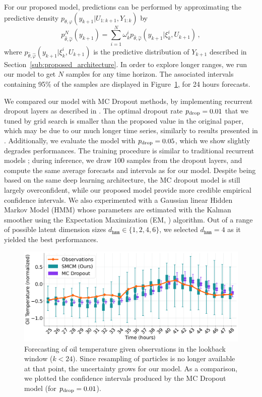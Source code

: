 \documentclass[conference]{IEEEtran}
\begin{document}
For our proposed model, predictions can be performed by approximating the predictive density $p_{\theta,\varphi}(y_{k+1}|U_{1:k+1},Y_{1:k})$ by
$$
	p^N_{\widehat\theta,\widehat\varphi}(y_{k+1})= \sum_{i=1}^{N}\omega_k^i p_{\widehat\theta,\widehat\varphi}(y_{k+1}|\xi_k^i,U_{k+1})\,,
$$
where $ p_{\widehat\theta,\widehat\varphi}(y_{k+1}|\xi_k^i,U_{k+1})$ is the predictive distribution of $Y_{k+1}$ described in Section~\ref{sub:proposed_architecture}.
In order to explore longer ranges, we run our model to get $N$ samples for any time horizon.
The associated intervals containing 95\% of the samples are displayed in Figure~\ref{fig:filter_k+24}, for 24 hours forecasts.

We compared our model with MC Dropout methods, by implementing recurrent dropout layers as described in \cite{Gal2016NIPS}.
The optimal dropout rate $p_\textnormal{drop}=0.01$ that we tuned by grid search is smaller than the proposed value in the original paper, which may be due to our much longer time series, similarly to results presented in \cite{Zhu2017DeepAC}.
Additionally, we evaluate the model with $p_\textnormal{drop}=0.05$, which we show slightly degrades performances.
The training procedure is similar to traditional recurrent models ; during inference, we draw $100$ samples from the dropout layers, and compute the same average forecasts and  intervals as for our model.
Despite being based on the same deep learning architecture, the MC dropout model is still largely overconfident, while our proposed model provide more credible empirical confidence intervals.
We also experimented with a Gaussian linear Hidden Markov Model (HMM) whose parameters are estimated with the Kalman smoother using the Expectation Maximization (EM, \cite{Dempster77EM}) algorithm.
Out of a range of possible latent dimension sizes $d_{\texttt{hmm}} \in \{1, 2, 4, 6\}$, we selected $d_{\texttt{hmm}}=4$ as it yielded the best performances.

\begin{figure}[htpb]
	\centering
	\includegraphics[width=0.8\linewidth]{filter_kp24_ett.png}
	\caption{Forecasting of oil temperature given observations in the lookback window ($k<24$).
		Since resampling of particles is no longer available at that point, the uncertainty grows for our model.
		As a comparison, we plotted the confidence intervals produced by the MC Dropout model (for $p_\textnormal{drop}=0.01$).}
	\label{fig:filter_k+24}
\end{figure}
\end{document}
